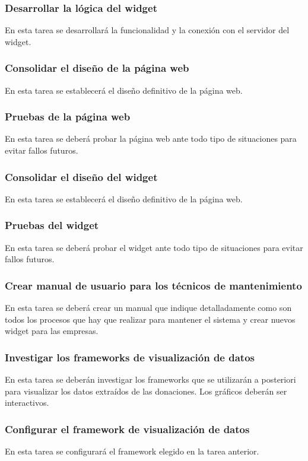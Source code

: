\subsubsection{Desarrollar la lógica del widget}
En esta tarea se desarrollará la funcionalidad y la conexión con el servidor del widget.

\subsubsection{Consolidar el diseño de la página web}
En esta tarea se establecerá el diseño definitivo de la página web.

\subsubsection{Pruebas de la página web}
En esta tarea se deberá probar la página web ante todo tipo de situaciones para evitar fallos futuros.

\subsubsection{Consolidar el diseño del widget}
En esta tarea se establecerá el diseño definitivo de la página web.

\subsubsection{Pruebas del widget}
En esta tarea se deberá probar el widget ante todo tipo de situaciones para evitar fallos futuros.

\subsubsection{Crear manual de usuario para los técnicos de mantenimiento}
En esta tarea se deberá crear un manual que indique detalladamente como son todos los procesos que hay que realizar para mantener el sistema y crear nuevos widget para las empresas.

\subsubsection{Investigar los frameworks de visualización de datos}
En esta tarea se deberán investigar los frameworks que se utilizarán a posteriori para visualizar los datos extraídos de las donaciones. Los gráficos deberán ser interactivos.

\subsubsection{Configurar el framework de visualización de datos}
En esta tarea se configurará el framework elegido en la tarea anterior.

